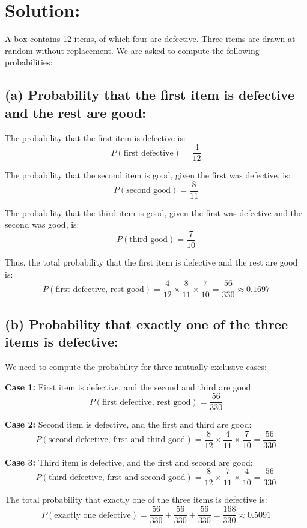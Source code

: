 \documentclass{article}
\begin{document}
\section*{Solution:}

A box contains 12 items, of which four are defective. Three items are drawn at random without replacement. We are asked to compute the following probabilities:

\subsection*{(a) Probability that the first item is defective and the rest are good:}

The probability that the first item is defective is:
\[
P(\text{first defective}) = \frac{4}{12}
\]

The probability that the second item is good, given the first was defective, is:
\[
P(\text{second good}) = \frac{8}{11}
\]

The probability that the third item is good, given the first was defective and the second was good, is:
\[
P(\text{third good}) = \frac{7}{10}
\]

Thus, the total probability that the first item is defective and the rest are good is:
\[
P(\text{first defective, rest good}) = \frac{4}{12} \times \frac{8}{11} \times \frac{7}{10} = \frac{56}{330} \approx 0.1697
\]

\subsection*{(b) Probability that exactly one of the three items is defective:}

We need to compute the probability for three mutually exclusive cases:

\textbf{Case 1:} First item is defective, and the second and third are good:
\[
P(\text{first defective, rest good}) = \frac{56}{330}
\]

\textbf{Case 2:} Second item is defective, and the first and third are good:
\[
P(\text{second defective, first and third good}) = \frac{8}{12} \times \frac{4}{11} \times \frac{7}{10} = \frac{56}{330}
\]

\textbf{Case 3:} Third item is defective, and the first and second are good:
\[
P(\text{third defective, first and second good}) = \frac{8}{12} \times \frac{7}{11} \times \frac{4}{10} = \frac{56}{330}
\]

The total probability that exactly one of the three items is defective is:
\[
P(\text{exactly one defective}) = \frac{56}{330} + \frac{56}{330} + \frac{56}{330} = \frac{168}{330} \approx 0.5091
\]
\end{document}
